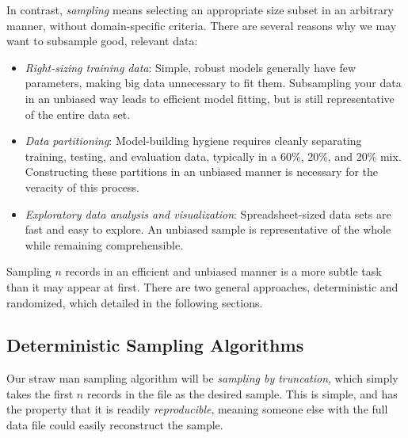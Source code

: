 \documentclass[10pt]{article}
\begin{document}
\begin{enumerate}
In contrast, \textit{sampling} means selecting an appropriate size subset in an arbitrary manner, without domain-specific criteria. There are several reasons why we may want to subsample good, relevant data:
\begin{itemize}
    \item \textit{Right-sizing training data}: Simple, robust models generally have few parameters, making big data unnecessary to fit them. Subsampling your data in an unbiased way leads to efficient model fitting, but is still representative of the entire data set.
    \item \textit{Data partitioning}: Model-building hygiene requires cleanly separating training, testing, and evaluation data, typically in a 60\%, 20\%, and 20\% mix. Constructing these partitions in an unbiased manner is necessary for the veracity of this process.
    \item \textit{Exploratory data analysis and visualization}: Spreadsheet-sized data sets are fast and easy to explore. An unbiased sample is representative of the whole while remaining comprehensible.
\end{itemize}

Sampling $n$ records in an efficient and unbiased manner is a more subtle task than it may appear at first. There are two general approaches, deterministic and randomized, which detailed in the following sections.

\subsection{Deterministic Sampling Algorithms}
Our straw man sampling algorithm will be \textit{sampling by truncation}, which simply takes the first $n$ records in the file as the desired sample. This is simple, and has the property that it is readily \textit{reproducible}, meaning someone else with the full data file could easily reconstruct the sample.


\end{enumerate}
\end{document}
